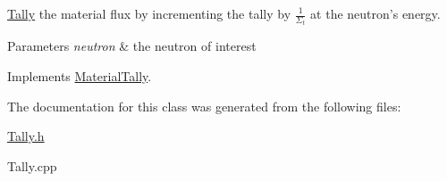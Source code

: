 \hyperlink{classTally}{Tally} the material flux by incrementing the tally by $ \frac{1}{\Sigma_t} $ at the neutron's energy. 


\begin{DoxyParams}{Parameters}
{\em neutron} & the neutron of interest \\
\hline
\end{DoxyParams}


Implements \hyperlink{classMaterialTally_ab2debba62f51212ec8b39b7aeea3f54d}{Material\-Tally}.



The documentation for this class was generated from the following files\-:\begin{DoxyCompactItemize}
\item 
\hyperlink{Tally_8h}{Tally.\-h}\item 
Tally.\-cpp\end{DoxyCompactItemize}
